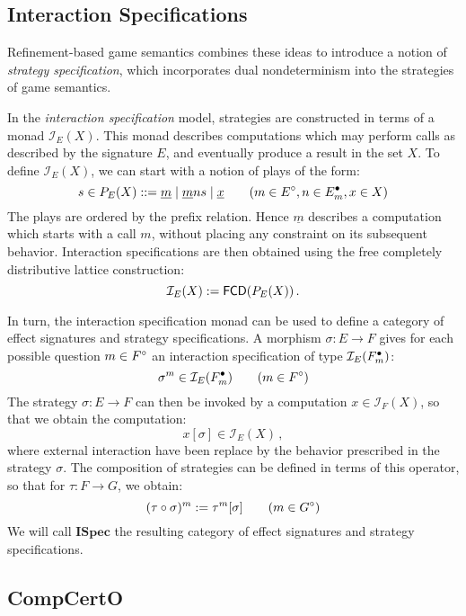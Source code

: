 \documentclass[sigplan,10pt,authordraft]{acmart}
\newcommand{\ISpec}{\mathbf{ISpec}}
\begin{document}

\subsection{Interaction Specifications} %

Refinement-based game semantics \cite{rbgs-cal}
combines these ideas to introduce a notion of
\emph{strategy specification},
which incorporates dual nondeterminism
into the strategies of game semantics.

In the \emph{interaction specification} model,
strategies are constructed in terms of a monad $\mathcal{I}_E(X)$.
This monad describes computations
which may perform calls as described by the signature $E$,
and eventually produce a result in the set $X$.
To define $\mathcal{I}_E(X)$,
we can start with a notion of plays of the form:
\[
  s \in P_E(X) ::=
    \underline{m} \mid
    \underline{m}ns \mid
    \underline{x}
  \qquad
  (m \in E^\circ, n \in E^\bullet_m, x \in X)
\]
The plays are ordered by the prefix relation.
Hence $\underline{m}$ describes a computation
which starts with a call $m$,
without placing any constraint on its subsequent behavior.
Interaction specifications are then obtained
using the free completely distributive lattice construction:
\[
  \mathcal{I}_E(X) :=  \mathsf{FCD} (P_E(X)) \,.
\]

In turn,
the interaction specification monad can be used to define
a category of effect signatures and strategy specifications.
A morphism $\sigma : E \rightarrow F$
gives for each possible question $m \in F^\circ$
an interaction specification of type $\mathcal{I}_E(F^\bullet_m)$:
\[
  \sigma^m \in \mathcal{I}_E(F^\bullet_m)
  \qquad
  (m \in F^\circ)
\]
The strategy $\sigma : E \rightarrow F$
can then be invoked by a computation $x \in \mathcal{I}_F(X)$,
so that we obtain the computation:
\[
  x[\sigma] \in \mathcal{I}_E(X) \,,
\]
where external interaction have been
replace by the behavior prescribed in
the strategy $\sigma$.
The composition of strategies can be defined
in terms of this operator,
so that for $\tau : F \rightarrow G$,
we obtain:
\[
  (\tau \circ \sigma)^m := \tau^m[\sigma]
  \qquad
  (m \in G^\circ)
\]
We will call $\ISpec$ the resulting category
of effect signatures and strategy specifications.


\subsection{CompCertO} \label{sec:mainideas:compcerto} %
\end{document}
